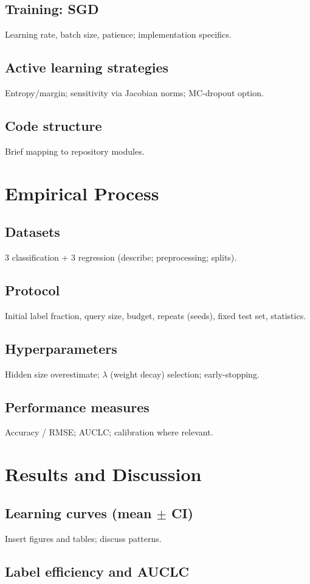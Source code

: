 \documentclass[11pt]{article}
\begin{document}
\subsection{Training: SGD}
Learning rate, batch size, patience; implementation specifics.
\subsection{Active learning strategies}
Entropy/margin; sensitivity via Jacobian norms; MC-dropout option.
\subsection{Code structure}
Brief mapping to repository modules.

\section{Empirical Process}
\subsection{Datasets}
3 classification + 3 regression (describe; preprocessing; splits).
\subsection{Protocol}
Initial label fraction, query size, budget, repeats (seeds), fixed test set, statistics.
\subsection{Hyperparameters}
Hidden size overestimate; $\lambda$ (weight decay) selection; early-stopping.
\subsection{Performance measures}
Accuracy / RMSE; AUCLC; calibration where relevant.

\section{Results and Discussion}
\subsection{Learning curves (mean $\pm$ CI)}
Insert figures and tables; discuss patterns.
\subsection{Label efficiency and AUCLC}
\end{document}
